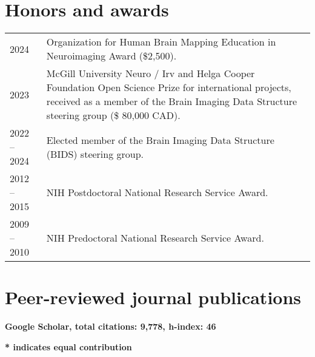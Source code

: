 \documentclass[11pt,fullpage]{article}
\begin{document}
\section*{Honors and awards}
\begin{tabular}{p{}p{}}

2024 & Organization for Human Brain Mapping Education in Neuroimaging Award (\$2,500).\\
2023 &  McGill University Neuro / Irv and Helga Cooper Foundation Open Science Prize for international projects, received as a member of the Brain Imaging Data Structure steering group (\$ 80,000 CAD).\\
2022 -- 2024 & Elected member of the Brain Imaging Data Structure (BIDS) steering group. \\
2012 -- 2015 & NIH Postdoctoral National Research Service Award. \\
2009 -- 2010 & NIH Predoctoral National Research Service Award. \\
\end{tabular}

\section*{Peer-reviewed journal publications}
\textbf{Google Scholar, total citations: 9,778, h-index: 46}

\textbf{* indicates equal contribution}
\end{document}
